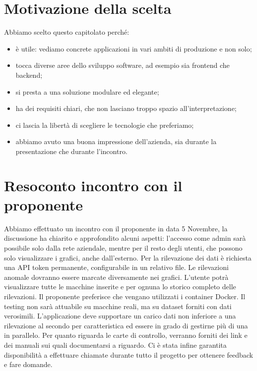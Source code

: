 \documentclass[12pt]{article}
\begin{document}
\section*{Motivazione della scelta}

Abbiamo scelto questo capitolato perché:
\begin{itemize}
    \item è utile: vediamo concrete applicazioni in vari ambiti di produzione e non solo;
    \item tocca diverse aree dello sviluppo software, ad esempio sia frontend che backend;
    \item si presta a una soluzione modulare ed elegante;
    \item ha dei requisiti chiari, che non lasciano troppo spazio all'interpretazione;
    \item ci lascia la libertà di scegliere le tecnologie che preferiamo;
    \item abbiamo avuto una buona impressione dell'azienda, sia durante la presentazione che durante l'incontro.
\end{itemize}

\section*{Resoconto incontro con il proponente}

Abbiamo effettuato un incontro con il proponente in data 5 Novembre, la discussione ha chiarito e approfondito alcuni aspetti: l'accesso come admin sarà possibile solo dalla rete aziendale, mentre per il resto degli utenti, che possono solo visualizzare i grafici, anche dall'esterno.
Per la rilevazione dei dati è richiesta una API token permanente, configurabile in un relativo file. Le rilevazioni anomale dovranno essere marcate diversamente nei grafici. L'utente potrà visualizzare tutte le macchine inserite e per ognuna lo storico completo delle rilevazioni.
Il proponente preferisce che vengano utilizzati i container Docker.
Il testing non sarà attuabile su macchine reali, ma su dataset forniti con dati verosimili.
L'applicazione deve supportare un carico dati non inferiore a una rilevazione al secondo per caratteristica ed essere in grado di gestirne più di una in parallelo.
Per quanto riguarda le carte di controllo, verranno forniti dei link e dei manuali sui quali documentarsi a riguardo. 
Ci è stata infine garantita disponibilità a effettuare chiamate durante tutto il progetto per ottenere feedback e fare domande.
\end{document}
